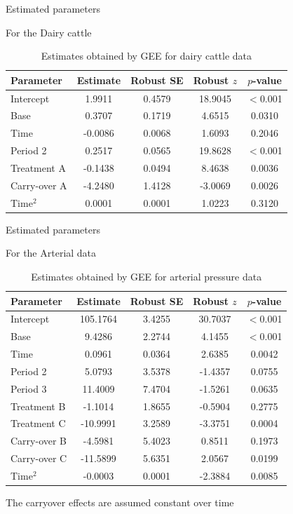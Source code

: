 \documentclass[t,9pt]{beamer}
\begin{document}
\begin{frame}[fragile]{Estimated parameters}

\begin{block}{For the Dairy cattle}
\begin{table}[ht]
\centering
\begin{tabular}{|l|cccc|}
  \hline
  Parameter &  Estimate  & Robust SE & Robust $z$ & $p$-value\\ 
  \hline
 Intercept &1.9911 & 0.4579 & 18.9045 &$<$0.001  \\
 Base & 0.3707 & 0.1719 & 4.6515 & 0.0310\\  
 Time & -0.0086 & 0.0068 & 1.6093 & 0.2046\\
 Period 2 &  0.2517 & 0.0565 & 19.8628  & $<$0.001 \\  
  Treatment A &-0.1438 & 0.0494 & 8.4638 & 0.0036\\ 
 Carry-over A &   -4.2480 & 1.4128 & -3.0069 & 0.0026\\ 
 Time$^2$ & 0.0001 & 0.0001 & 1.0223 & 0.3120  \\ 
   \hline
\end{tabular}
\caption{Estimates obtained by GEE for dairy cattle data }
\label{tabla33}
\end{table}
\end{block}

\end{frame}

\begin{frame}[fragile]{Estimated parameters}

\begin{block}{For the Arterial data}
\begin{table}[ht]
\centering
\begin{tabular}{|l|cccc|}
  \hline
  Parameter &  Estimate  & Robust SE & Robust $z$ & $p$-value\\ 
  \hline
 Intercept & 105.1764 & 3.4255 & 30.7037& $<$0.001  \\  
 Base & 9.4286 & 2.2744 & 4.1455&$<$0.001\\  
 Time &0.0961 & 0.0364 & 2.6385 & 0.0042 \\
 Period 2 & 5.0793 & 3.5378 & -1.4357 & 0.0755\\  
 Period 3 &11.4009 & 7.4704 & -1.5261 & 0.0635 \\ 
 Treatment B &-1.1014 & 1.8655 & -0.5904 & 0.2775 \\ 
 Treatment C &  -10.9991 & 3.2589 & -3.3751 & 0.0004 \\ 
 Carry-over B &  -4.5981 & 5.4023 & 0.8511 & 0.1973\\ 
 Carry-over C & -11.5899 & 5.6351 & 2.0567 & 0.0199 \\ 
 Time$^2$ & -0.0003 & 0.0001 & -2.3884 & 0.0085\\ 
   \hline
\end{tabular}
\caption{Estimates obtained by GEE for arterial pressure data }
\label{tabla3}
\end{table}
\end{block}
\alert{The carryover effects are assumed constant over time}
\end{frame}
\end{document}
